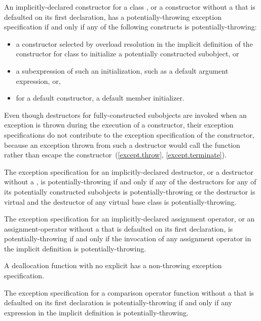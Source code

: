\pnum
An implicitly-declared constructor for a class ,
or a constructor without a 
that is defaulted on its first declaration,
has a potentially-throwing exception specification
if and only if
any of the following constructs is potentially-throwing:
\begin{itemize}
\item
a constructor selected by overload resolution
in the implicit definition of the constructor
for class 
to initialize a potentially constructed subobject, or
\item
a subexpression of such an initialization,
such as a default argument expression, or,
\item
for a default constructor, a default member initializer.
\end{itemize}
\begin{note}
Even though destructors for fully-constructed subobjects
are invoked when an exception is thrown
during the execution of a constructor,
their exception specifications do not contribute
to the exception specification of the constructor,
because an exception thrown from such a destructor
would call the function 
rather than escape the constructor~(\ref{except.throw}, \ref{except.terminate}).
\end{note}

\pnum
The exception specification for an implicitly-declared destructor,
or a destructor without a ,
is potentially-throwing if and only if
any of the destructors
for any of its potentially constructed subobjects
is potentially-throwing or
the destructor is virtual and the destructor of any virtual base class
is potentially-throwing.

\pnum
The exception specification for an implicitly-declared assignment operator,
or an assignment-operator without a 
that is defaulted on its first declaration,
is potentially-throwing if and only if
the invocation of any assignment operator
in the implicit definition is potentially-throwing.

\pnum
A deallocation function
with no explicit 
has a non-throwing exception specification.

\pnum
The exception specification for a comparison operator function
without a 
that is defaulted on its first declaration
is potentially-throwing if and only if
any expression
in the implicit definition is potentially-throwing.


